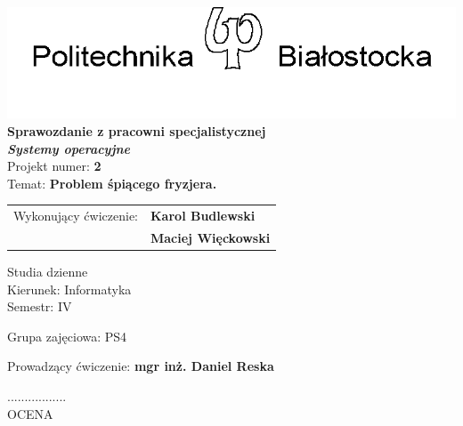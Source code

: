\documentclass[12pt,a4paper]{article}
\newcommand{\numerzajec}{2}
\newcommand{\tematzajec}{Problem śpiącego fryzjera.}
\begin{document}
	\thispagestyle{empty}
	\begin{center}
		\vspace*{1.6cm}
		\includegraphics[width=0.55\linewidth]{pblogo.png}	\\
		\vspace{0.5cm}
		\large
		\textsf{\textbf{Sprawozdanie z pracowni specjalistycznej}} \\
		\vspace{0.5cm}
		\textsf{\textbf{\textit{Systemy operacyjne}}}	\\
		\vspace{1cm}
		\textsf{Projekt numer: \textbf{\numerzajec}}	\\
		\vspace{0.5cm}
		\textsf{Temat: \textbf{\tematzajec}}
	\end{center}

	\vspace{2cm}
	\begin{tabular}{rl}
        Wykonujący ćwiczenie: &\textbf{Karol Budlewski} \\
                              & \textbf{Maciej Więckowski} \\
	\end{tabular}

	\vspace{3.5cm}	

	\begin{minipage}{0.45\linewidth}
		\large
		\begin{spacing}{1.5}
		Studia dzienne \\
		Kierunek: Informatyka \\
		Semestr: IV \\
		\end{spacing}
	\end{minipage}
	\begin{minipage}[t]{0.5\linewidth}
		\large
		\begin{spacing}{1.2}
		Grupa zajęciowa: PS4
		\end{spacing}
	\end{minipage}
	
	Prowadzący ćwiczenie: \textbf{mgr inż. Daniel Reska} \\
	
	\begin{flushright}
		\begin{minipage}[t]{0.3\linewidth}
			\centering
			................. \\
			\small OCENA
		\end{minipage}
	\end{flushright}
	
\end{document}
